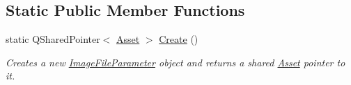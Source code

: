 \subsection*{Static Public Member Functions}
\begin{DoxyCompactItemize}
\item 
\hypertarget{class_picto_1_1_image_file_parameter_a6f1e7460de5277c86d373ce3480f1687}{static Q\-Shared\-Pointer$<$ \hyperlink{class_picto_1_1_asset}{Asset} $>$ \hyperlink{class_picto_1_1_image_file_parameter_a6f1e7460de5277c86d373ce3480f1687}{Create} ()}\label{class_picto_1_1_image_file_parameter_a6f1e7460de5277c86d373ce3480f1687}

\begin{DoxyCompactList}\small\item\em Creates a new \hyperlink{class_picto_1_1_image_file_parameter}{Image\-File\-Parameter} object and returns a shared \hyperlink{class_picto_1_1_asset}{Asset} pointer to it. \end{DoxyCompactList}\end{DoxyCompactItemize}
